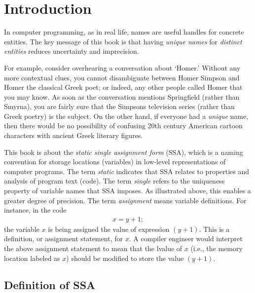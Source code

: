 \chapter{Introduction }
\label{chapter:vanilla}




In computer programming, as in real life, names are useful handles for concrete entities.
The key message of this book is that having \textit{unique names} for \textit{distinct entities} reduces uncertainty and imprecision.

For example, consider overhearing a conversation about `Homer.' 
Without any more contextual clues, you cannot disambiguate between Homer Simpson and Homer the classical Greek poet; 
or indeed, any other people called Homer that you may know. 
As soon as the conversation mentions Springfield (rather than Smyrna), you are fairly sure that the Simpsons television series (rather than Greek poetry) is the subject. 
On the other hand, if everyone had a \textit{unique} name, then there would be no possibility of confusing 20th century American cartoon characters with ancient Greek literary figures.


This book is about the \textit{static single assignment form} (SSA), which is a naming convention for storage locations (variables) in low-level representations of computer programs. 
The term \textit{static} indicates that SSA relates to properties and analysis of program text (code). 
The term \textit{single} refers to the uniqueness property of variable names that SSA imposes. 
As illustrated above, this enables a greater degree of precision. 
The term \textit{assignment} means variable definitions. 
For instance, in the code \begin{equation*} \begin{array}{l} x = y+1;
\end{array} \end{equation*} the variable $x$ is being assigned the value of expression $(y+1)$. 
This is a definition, or assignment statement, for $x$. 
A compiler engineer would interpret the above assignment statement to mean that the lvalue of $x$ (i.e., the memory location labeled as $x$) should be modified to store the value $(y+1)$.


\section{Definition of SSA}


